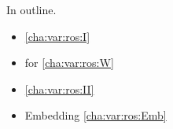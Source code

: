 \begin{note}
  In outline.
  \begin{itemize}
  \item
    \supportI{} \hfill \autoref{cha:var:ros:I}
  \item
     for  \hfill \autoref{cha:var:ros:W}
  \item
    \supportII{} \hfill \autoref{cha:var:ros:II}
  \item
    Embedding \hfill \autoref{cha:var:ros:Emb}
  \end{itemize}
\end{note}

\subsection{\supportI{}}
\label{cha:var:ros:I}

